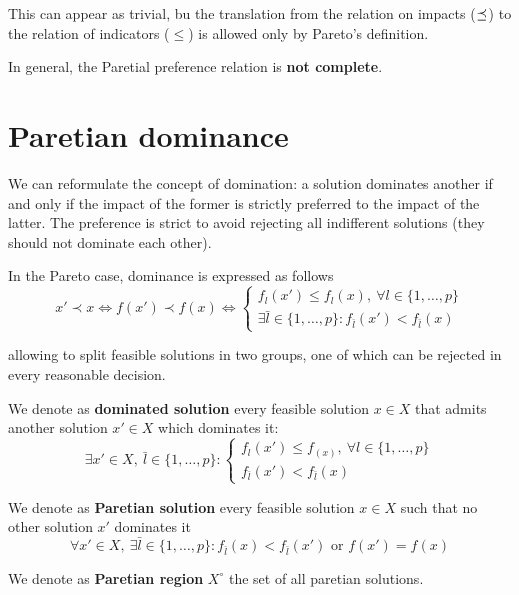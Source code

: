 This can appear as trivial, bu the translation from the relation on impacts ($\preceq_{}$) to the relation of indicators ($\leq$) is allowed only by Pareto's definition.

In general, the Paretial preference relation is \textbf{not complete}.

\section{Paretian dominance}
\label{sec:paretiandom}

We can reformulate the concept of domination: a solution dominates another if and only if the impact of the former is strictly preferred to the impact of the latter. The preference is strict to avoid rejecting all indifferent solutions (they should not dominate each other).

In the Pareto case, dominance is expressed as follows
$$ x' \prec x \Leftrightarrow f(x') \prec f(x) \Leftrightarrow \begin{cases}
	f_l (x') \leq f_l (x), \ \forall l \in \{1, \dots, p \} \\
	\exists \bar l \in \{1, \dots, p\} : f_{\bar l} (x') < f_{\bar l} (x)
\end{cases}$$

allowing to split feasible solutions in two groups, one of which can be rejected in every reasonable decision.\\

\begin{definition}
	We denote as \textbf{dominated solution} every feasible solution $x \in X$ that admits another solution $x' \in X$ which dominates it: 
	$$ 
	\exists x' \in X, \ \bar l \in \{1, \dots , p \} : \begin{cases}
		f_l (x') \leq f_(x), \ \forall l \in \{1, \dots, p\} \\
		f_{\bar l} (x') < f_{\bar l} (x)
	\end{cases}
	$$
\end{definition}

\begin{definition}
	We denote as \textbf{Paretian solution} every feasible solution $x \in X$ such that no other solution $x'$ dominates it
	$$ \forall x' \in X, \ \exists \bar l \in \{1, \dots, p\} : f_{\bar l} (x) < f_{\bar l} (x') \text{ or } f(x') = f(x) $$
\end{definition}

\begin{definition}
	We denote as \textbf{Paretian region} $X^\circ$ the set of all paretian solutions.
\end{definition}

